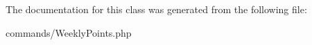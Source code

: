 

The documentation for this class was generated from the following file\-:\begin{DoxyCompactItemize}
\item 
commands/Weekly\-Points.\-php\end{DoxyCompactItemize}

